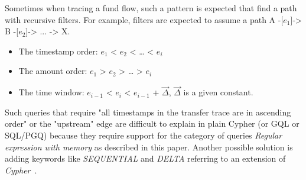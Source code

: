 
Sometimes when tracing a fund flow, such a pattern is expected that find a path
with recursive filters. For example, filters are expected to assume a path A
-[${e_1}$]-> B -[${e_2}$]-> ... -> X.

\begin{itemize}
    \item The timestamp order: ${e_1}$ < ${e_2}$ < … < ${e_i}$
    \item The amount order: ${e_1}$ > ${e_2}$ > … > ${e_i}$
    \item The time window: ${e_{i-1}}$ < ${e_i}$ < ${e_{i-1}}$ + $\vec{\Delta}$,
    $\vec{\Delta}$ is a given constant.
\end{itemize}

Such queries that require "all timestamps in the transfer trace are in ascending order" or the "upstream" edge are
difficult to explain in plain Cypher (or GQL or SQL/PGQ) because they require support for the category of queries
\emph{Regular expression with memory} as described in this paper\cite{10.1145/2274576.2274585}. Another possible solution is
adding keywords like \emph{SEQUENTIAL} and \emph{DELTA} referring to an extension of \emph{Cypher}~\cite{tcypher}. 


